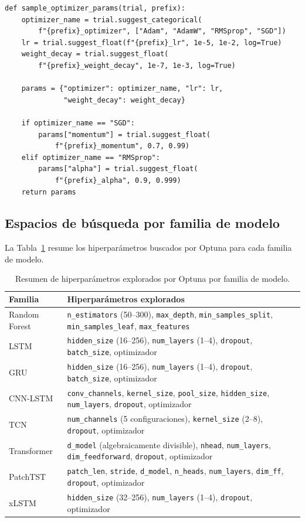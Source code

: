 \documentclass[12pt, a4paper]{article}
\newcommand{\code}[1]{\texttt{#1}}
\begin{document}
\begin{lstlisting}[caption={Búsqueda condicional de optimizador en Optuna.}, label={lst:conditional_search}]
def sample_optimizer_params(trial, prefix):
    optimizer_name = trial.suggest_categorical(
        f"{prefix}_optimizer", ["Adam", "AdamW", "RMSprop", "SGD"])
    lr = trial.suggest_float(f"{prefix}_lr", 1e-5, 1e-2, log=True)
    weight_decay = trial.suggest_float(
        f"{prefix}_weight_decay", 1e-7, 1e-3, log=True)

    params = {"optimizer": optimizer_name, "lr": lr,
              "weight_decay": weight_decay}

    if optimizer_name == "SGD":
        params["momentum"] = trial.suggest_float(
            f"{prefix}_momentum", 0.7, 0.99)
    elif optimizer_name == "RMSprop":
        params["alpha"] = trial.suggest_float(
            f"{prefix}_alpha", 0.9, 0.999)
    return params
\end{lstlisting}

\subsection{Espacios de búsqueda por familia de modelo}

La Tabla~\ref{tab:search_spaces} resume los hiperparámetros buscados por Optuna para cada familia de modelo.

\begin{table}[H]
\centering
\caption{Resumen de hiperparámetros explorados por Optuna por familia de modelo.}
\label{tab:search_spaces}
\small
\begin{tabular}{@{}lp{9cm}@{}}
\toprule
\textbf{Familia} & \textbf{Hiperparámetros explorados} \\
\midrule
Random Forest & \code{n\_estimators} (50--300), \code{max\_depth}, \code{min\_samples\_split}, \code{min\_samples\_leaf}, \code{max\_features} \\
LSTM & \code{hidden\_size} (16--256), \code{num\_layers} (1--4), \code{dropout}, \code{batch\_size}, optimizador \\
GRU & \code{hidden\_size} (16--256), \code{num\_layers} (1--4), \code{dropout}, \code{batch\_size}, optimizador \\
CNN-LSTM & \code{conv\_channels}, \code{kernel\_size}, \code{pool\_size}, \code{hidden\_size}, \code{num\_layers}, \code{dropout}, optimizador \\
TCN & \code{num\_channels} (5 configuraciones), \code{kernel\_size} (2--8), \code{dropout}, optimizador \\
Transformer & \code{d\_model} (algebraicamente divisible), \code{nhead}, \code{num\_layers}, \code{dim\_feedforward}, \code{dropout}, optimizador \\
PatchTST & \code{patch\_len}, \code{stride}, \code{d\_model}, \code{n\_heads}, \code{num\_layers}, \code{dim\_ff}, \code{dropout}, optimizador \\
xLSTM & \code{hidden\_size} (32--256), \code{num\_layers} (1--4), \code{dropout}, optimizador \\
\bottomrule
\end{tabular}
\end{table}
\end{document}
